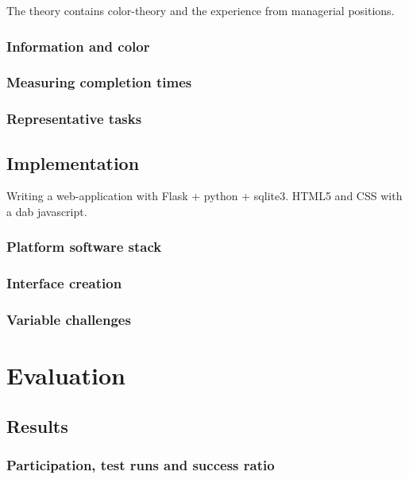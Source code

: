 \documentclass[nofilelist]{cslthse-msc}
\begin{document}
			The theory contains color-theory and the experience from managerial
			positions.

			\subsection{Information and color}

			\subsection{Measuring completion times}

			\subsection{Representative tasks}

		\section{Implementation}

			Writing a web-application with Flask + python + sqlite3.
			HTML5 and CSS with a dab javascript.

			\subsection{Platform software stack}

			\subsection{Interface creation}

			\subsection{Variable challenges}

	\chapter{Evaluation}

		\section{Results}

			\subsection{Participation, test runs and success ratio}
\end{document}
